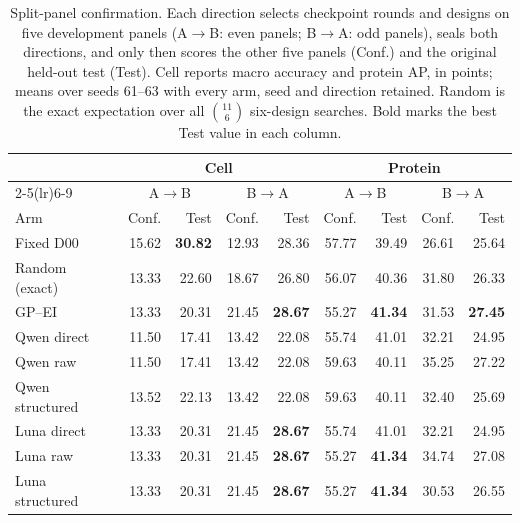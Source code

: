 \begin{table}[htbp]
\centering
\scriptsize
\setlength{\tabcolsep}{3.2pt}
\caption{Split-panel confirmation. Each direction selects checkpoint rounds and designs on five development panels (A$\to$B: even panels; B$\to$A: odd panels), seals both directions, and only then scores the other five panels (Conf.) and the original held-out test (Test). Cell reports macro accuracy and protein AP, in points; means over seeds 61--63 with every arm, seed and direction retained. Random is the exact expectation over all $\binom{11}{6}$ six-design searches. Bold marks the best Test value in each column.}
\label{tab:split-panel-confirmation}
\begin{tabular}{lrrrrrrrr}
\toprule
 & \multicolumn{4}{c}{Cell} & \multicolumn{4}{c}{Protein} \\
\cmidrule(lr){2-5}\cmidrule(lr){6-9}
 & \multicolumn{2}{c}{A$\to$B} & \multicolumn{2}{c}{B$\to$A} & \multicolumn{2}{c}{A$\to$B} & \multicolumn{2}{c}{B$\to$A} \\
Arm & Conf. & Test & Conf. & Test & Conf. & Test & Conf. & Test \\
\midrule
Fixed D00 & 15.62 & \textbf{30.82} & 12.93 & 28.36 & 57.77 & 39.49 & 26.61 & 25.64 \\
Random (exact) & 13.33 & 22.60 & 18.67 & 26.80 & 56.07 & 40.36 & 31.80 & 26.33 \\
GP--EI & 13.33 & 20.31 & 21.45 & \textbf{28.67} & 55.27 & \textbf{41.34} & 31.53 & \textbf{27.45} \\
\addlinespace
Qwen direct & 11.50 & 17.41 & 13.42 & 22.08 & 55.74 & 41.01 & 32.21 & 24.95 \\
Qwen raw & 11.50 & 17.41 & 13.42 & 22.08 & 59.63 & 40.11 & 35.25 & 27.22 \\
Qwen structured & 13.52 & 22.13 & 13.42 & 22.08 & 59.63 & 40.11 & 32.40 & 25.69 \\
\addlinespace
Luna direct & 13.33 & 20.31 & 21.45 & \textbf{28.67} & 55.74 & 41.01 & 32.21 & 24.95 \\
Luna raw & 13.33 & 20.31 & 21.45 & \textbf{28.67} & 55.27 & \textbf{41.34} & 34.74 & 27.08 \\
Luna structured & 13.33 & 20.31 & 21.45 & \textbf{28.67} & 55.27 & \textbf{41.34} & 30.53 & 26.55 \\
\bottomrule
\end{tabular}
\end{table}
